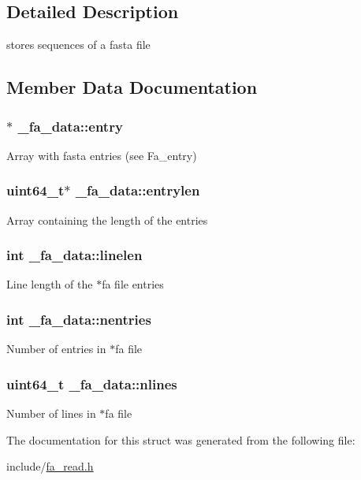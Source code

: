 \subsection{Detailed Description}
stores sequences of a fasta file 

\subsection{Member Data Documentation}
\hypertarget{struct__fa__data_a3c2c4488c834a828085df7b409d292e4}{
\subsubsection[{entry}]{$\ast$ \+\_\+fa\+\_\+data\+::entry}}\label{struct__fa__data_a3c2c4488c834a828085df7b409d292e4}
Array with fasta entries (see Fa\+\_\+entry) \hypertarget{struct__fa__data_acdb54c828a0fbfe8b8851f5290afc16e}{
\subsubsection[{entrylen}]{\setlength{\rightskip}{0pt plus 5cm}uint64\+\_\+t$\ast$ \+\_\+fa\+\_\+data\+::entrylen}}\label{struct__fa__data_acdb54c828a0fbfe8b8851f5290afc16e}
Array containing the length of the entries \hypertarget{struct__fa__data_a3607f37f43d8b2f14ced6a93c6a444ff}{
\subsubsection[{linelen}]{\setlength{\rightskip}{0pt plus 5cm}int \+\_\+fa\+\_\+data\+::linelen}}\label{struct__fa__data_a3607f37f43d8b2f14ced6a93c6a444ff}
Line length of the $\ast$fa file entries \hypertarget{struct__fa__data_a2e49d8da3a888d7df62cd887367e2923}{
\subsubsection[{nentries}]{\setlength{\rightskip}{0pt plus 5cm}int \+\_\+fa\+\_\+data\+::nentries}}\label{struct__fa__data_a2e49d8da3a888d7df62cd887367e2923}
Number of entries in $\ast$fa file \hypertarget{struct__fa__data_a49ac64b09307f73104bbf1e650f3c2c5}{
\subsubsection[{nlines}]{\setlength{\rightskip}{0pt plus 5cm}uint64\+\_\+t \+\_\+fa\+\_\+data\+::nlines}}\label{struct__fa__data_a49ac64b09307f73104bbf1e650f3c2c5}
Number of lines in $\ast$fa file 

The documentation for this struct was generated from the following file\+:\begin{DoxyCompactItemize}
\item 
include/\hyperlink{fa__read_8h}{fa\+\_\+read.\+h}\end{DoxyCompactItemize}
